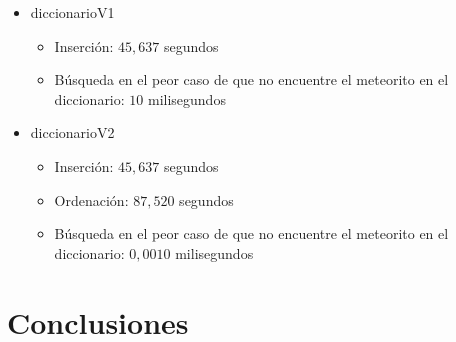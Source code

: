 \begin{itemize}
  \item diccionarioV1
  \begin{itemize}
    \item Inserción: $45,637$ segundos
    \item Búsqueda en el peor caso de que no encuentre el meteorito en el 
    diccionario: $10$ milisegundos
  \end{itemize}

    \item diccionarioV2
    \begin{itemize}
    \item Inserción: $45,637$ segundos
    \item Ordenación: $87,520$ segundos
    \item Búsqueda en el peor caso de que no encuentre el meteorito en el 
    diccionario: $0,0010$ milisegundos
  \end{itemize}
  \end{itemize}

\section{Conclusiones}



